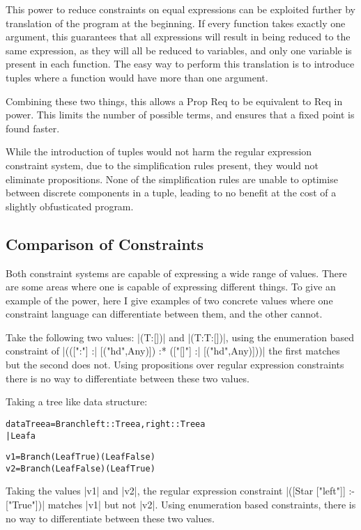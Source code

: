 \documentclass[preprint]{sigplanconf}
\newcommand{\C}[1]{\textsf{#1}}
\newenvironment{code}{\begin{alltt}\small}{\end{alltt}}
\begin{document}
This power to reduce constraints on equal expressions can be exploited further by translation of the program at the beginning. If every function takes exactly one argument, this guarantees that all expressions will result in being reduced to the same expression, as they will all be reduced to variables, and only one variable is present in each function. The easy way to perform this translation is to introduce tuples where a function would have more than one argument.

Combining these two things, this allows a \C{Prop Req} to be equivalent to \C{Req} in power. This limits the number of possible terms, and ensures that a fixed point is found faster.

While the introduction of tuples would not harm the regular expression constraint system, due to the simplification rules present, they would not eliminate propositions. None of the simplification rules are unable to optimise between discrete components in a tuple, leading to no benefit at the cost of a slightly obfusticated program.

\subsection{Comparison of Constraints}

Both constraint systems are capable of expressing a wide range of values. There are some areas where one is capable of expressing different things. To give an example of the power, here I give examples of two concrete values where one constraint language can differentiate between them, and the other cannot.

Take the following two values: |(T:[])| and |(T:T:[])|, using the enumeration based constraint of |(([":"] :| [("hd",Any)]) :* (["[]"] :| [("hd",Any)]))| the first matches but the second does not. Using propositions over regular expression constraints there is no way to differentiate between these two values.

Taking a tree like data structure:

\begin{code}
data Tree a  =  Branch {left :: Tree a, right :: Tree a}
             |  Leaf a

v1 = Branch (Leaf True   ) (Leaf False  )
v2 = Branch (Leaf False  ) (Leaf True   )
\end{code}

Taking the values |v1| and |v2|, the regular expression constraint |([Star ["left"]] :- ["True"])| matches |v1| but not |v2|. Using enumeration based constraints, there is no way to differentiate between these two values.
\end{document}
